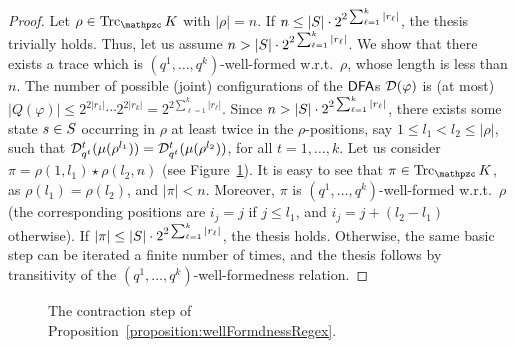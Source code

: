 \begin{proof}
Let $\rho\in\Trk_\Ku$ with  $|\rho|=n$. If $n\leq |S|\cdot 2^{2\sum^k_{\ell=1}|r_\ell|}$, the thesis trivially holds. 
%
Thus, let us assume $n > |S|\cdot 2^{2\sum^k_{\ell=1}|r_\ell|}$. We show that there exists a trace 
which is $(q^1,\ldots , q^k)$-well-formed w.r.t.\ $\rho$, whose length is less than $n$.
%
The number of possible (joint) configurations of the $\text{\sffamily DFA}$s $\mathcal{D}(\varphi)$ is (at most) $|Q(\varphi)|\leq 2^{2|r_1|}\cdots 2^{2|r_k|} = 2^{2\sum^k_{\ell=1}|r_\ell|}$. 
%
Since $n> |S|\cdot 2^{2\sum^k_{\ell=1}|r_\ell|}$, there exists some state $s\in S$ occurring in $\rho$ at least twice in the $\rho$-positions, say $1\leq l_1< l_2\leq |\rho|$, such that $\mathcal{D}^t_{q^t}(\mu(\rho^{l_1}))=\mathcal{D}^t_{q^t}(\mu(\rho^{l_2}))$, for all $t=1,\ldots,k$. 
Let us consider $\pi=\rho(1,l_1)\star\rho(l_2,n)$ (see Figure~\ref{fig:basicContrRegex}). 
It is easy to see that $\pi\in\Trk_\Ku$, as $\rho(l_1)=\rho(l_2)$, and $|\pi| < n$. Moreover, $\pi$ is $(q^1,\ldots , q^k)$-well-formed w.r.t.\ $\rho$ (the corresponding positions are $i_j=j$ if $j\leq l_1$, and $i_j=j+(l_2-l_1)$ otherwise). If $|\pi| \leq |S|\cdot 2^{2\sum^k_{\ell=1}|r_\ell|}$, the thesis holds. Otherwise, the same basic step can be iterated a finite number of times, and the thesis follows by transitivity of the $(q^1,\ldots , q^k)$-well-formedness relation.
\end{proof}

\begin{figure}[b]
\centering
    \caption{The contraction step of Proposition~\ref{proposition:wellFormdnessRegex}.}\label{fig:basicContrRegex}
\end{figure}


